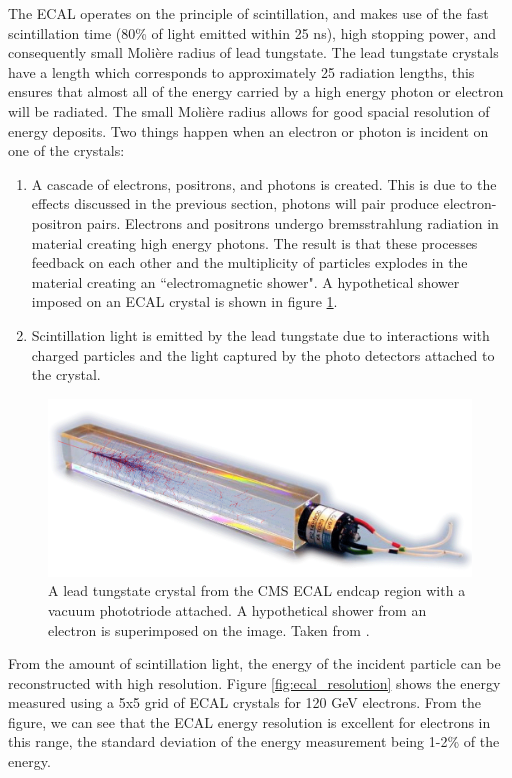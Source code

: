    The ECAL operates on the principle of scintillation\cite[ch. 7]{leo_detectors}, and makes use of the fast scintillation time (80\% of light emitted within 25 ns), high stopping power, and consequently small Moli\`ere radius of lead tungstate. The lead tungstate crystals have a length which corresponds to approximately 25 radiation lengths, this ensures that almost all of the energy carried by a high energy photon or electron will be radiated. The small Moli\`ere radius allows for good spacial resolution of energy deposits. \cite[pg. 90]{cms_jinst} Two things happen when an electron or photon is incident on one of the crystals:

    \begin{enumerate}
      \item A cascade of electrons, positrons, and photons is created. This is due to the effects discussed in the previous section, photons will pair produce electron-positron pairs. Electrons and positrons undergo bremsstrahlung radiation in material creating high energy photons. The result is that these processes feedback on each other and the multiplicity of particles explodes in the material creating an ``electromagnetic shower". A hypothetical shower imposed on an ECAL crystal is shown in figure \ref{fig:ecal_crystal}.

      \item Scintillation light is emitted by the lead tungstate due to interactions with charged particles and the light captured by the photo detectors attached to the crystal.
    \end{enumerate}

    \begin{figure}[h!]
      \centering
      \includegraphics[width=.5\textwidth]{figures/cms_ecal_crystal_shower.png}
      \caption{A lead tungstate crystal from the CMS ECAL endcap region with a vacuum phototriode attached. A hypothetical shower from an electron is superimposed on the image. Taken from \cite{ecal_crystal}.}
      \label{fig:ecal_crystal}
    \end{figure}

    From the amount of scintillation light, the energy of the incident particle can be reconstructed with high resolution. Figure \ref{fig:ecal_resolution} shows the energy measured using a 5x5 grid of ECAL crystals for 120 GeV electrons. From the figure, we can see that the ECAL energy resolution is excellent for electrons in this range, the standard deviation of the energy measurement being 1-2\% of the energy.


